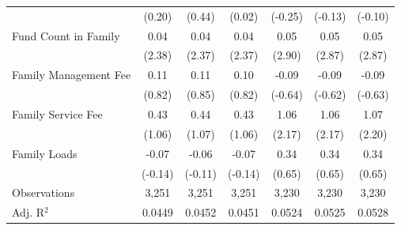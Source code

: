 {\begin{tabular}{l*{6}{c}}
                    &      (0.20)         &      (0.44)         &      (0.02)         &     (-0.25)         &     (-0.13)         &     (-0.10)         \\
\addlinespace
Fund Count in Family&        0.04\sym{**} &        0.04\sym{**} &        0.04\sym{**} &        0.05\sym{***}&        0.05\sym{***}&        0.05\sym{***}\\
                    &      (2.38)         &      (2.37)         &      (2.37)         &      (2.90)         &      (2.87)         &      (2.87)         \\
\addlinespace
Family Management Fee&        0.11         &        0.11         &        0.10         &       -0.09         &       -0.09         &       -0.09         \\
                    &      (0.82)         &      (0.85)         &      (0.82)         &     (-0.64)         &     (-0.62)         &     (-0.63)         \\
\addlinespace
Family Service Fee  &        0.43         &        0.44         &        0.43         &        1.06\sym{**} &        1.06\sym{**} &        1.07\sym{**} \\
                    &      (1.06)         &      (1.07)         &      (1.06)         &      (2.17)         &      (2.17)         &      (2.20)         \\
\addlinespace
Family Loads        &       -0.07         &       -0.06         &       -0.07         &        0.34         &        0.34         &        0.34         \\
                    &     (-0.14)         &     (-0.11)         &     (-0.14)         &      (0.65)         &      (0.65)         &      (0.65)         \\
\midrule
Observations        &       3,251         &       3,251         &       3,251         &       3,230         &       3,230         &       3,230         \\
Adj. R$^{2}$        &      0.0449         &      0.0452         &      0.0451         &      0.0524         &      0.0525         &      0.0528         \\
\bottomrule
\end{tabular}
}
